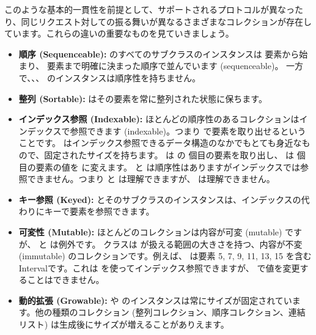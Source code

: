 \documentclass[a4paper,10pt,twoside]{book}
\begin{document}
このような基本的一貫性を前提として、サポートされるプロトコルが異なったり、同じリクエスト対しての振る舞いが異なるさまざまなコレクションが存在しています。これらの違いの重要なものを見ていきましょう。

\begin{itemize}
  \item {\bf 順序 (Sequenceable):}
   のすべてのサブクラスのインスタンスは  要素から始まり、 要素まで明確に決まった順序で並んでいます (sequenceable)。
  一方で、\mbox{、}\mbox{、} のインスタンスは順序性を持ちません。

  \item {\bf 整列 (Sortable):}
   はその要素を常に整列された状態に保ちます。

  \item {\bf インデックス参照 (Indexable):}
        ほとんどの順序性のあるコレクションはインデックスで参照できます (indexable)。つまり  で要素を取り出せるということです。
         はインデックス参照できるデータ構造のなかでもとても身近なもので、固定されたサイズを持ちます。 は  の  個目の要素を取り出し、 は  個目の要素の値を  に変えます。
         と  は順序性はありますがインデックスでは参照できません。つまり  と  は理解できますが、 は理解できません。

  \item {\bf キー参照 (Keyed):}
	 とそのサブクラスのインスタンスは、インデックスの代わりにキーで要素を参照できます。

  \item {\bf 可変性 (Mutable):}
        ほとんどのコレクションは内容が可変 (mutable) ですが、 と  は例外です。
         クラスは  が扱える範囲の大きさを持つ、内容が不変 (immutable) のコレクションです。例えば、 は要素 5, 7, 9, 11, 13, 15 を含むIntervalです。これは  を使ってインデックス参照できますが、 で値を変更することはできません。

  \item {\bf 動的拡張 (Growable):}
          や  のインスタンスは常にサイズが固定されています。他の種類のコレクション (整列コレクション、順序コレクション、連結リスト) は生成後にサイズが増えることがありえます。


\end{itemize}
\end{document}
